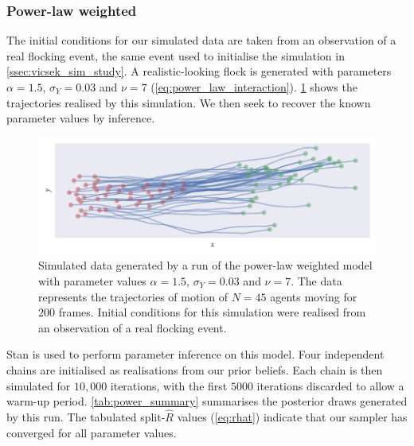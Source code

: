 \subsubsection{Power-law weighted}
\label{sssec:power_law_sim_study}

The initial conditions for our simulated data are taken from an observation of
a real flocking event, the same event used to initialise the simulation in
\cref{ssec:vicsek_sim_study}. A realistic-looking flock is generated with
parameters $\alpha=1.5$, $\sigma_Y=0.03$ and $\nu=7$
(\cref{eq:power_law_interaction}). \cref{fig:power_sim} shows the trajectories
realised by this simulation. We then seek to recover the known parameter values
by inference.
\begin{figure}[tbp]
  \includegraphics{power_sim.pdf}
  \caption{Simulated data generated by a run of the power-law weighted model
    with parameter values $\alpha=1.5$, $\sigma_Y=0.03$ and $\nu=7$. The data
    represents the trajectories of motion of $N=45$ agents moving for $200$
    frames. Initial conditions for this simulation were realised from an
    observation of a real flocking event.}
  \label{fig:power_sim}
\end{figure}

Stan is used to perform parameter inference on this model. Four independent
chains are initialised as realisations from our prior beliefs. Each chain is
then simulated for $10,000$ iterations, with the first $5000$ iterations
discarded to allow a warm-up period. \cref{tab:power_summary} summarises the
posterior draws generated by this run. The tabulated split-$\widehat{R}$
values (\cref{eq:rhat}) indicate that our sampler has converged for all
parameter values.

